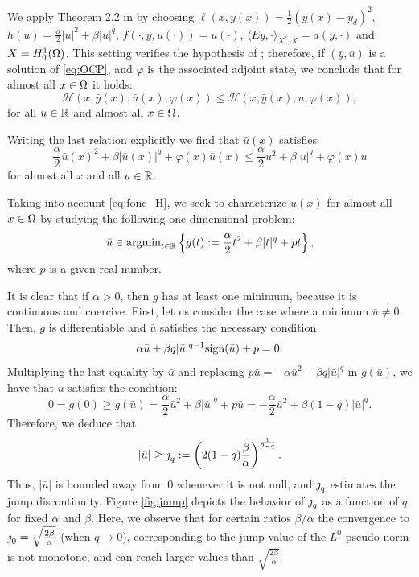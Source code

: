 	We apply Theorem 2.2 in \cite{ito-kunisch2014} by choosing $\ell(x,y(x))=\frac{1}{2}(y(x)-y_d)^2$, $h(u)=\frac{\alpha}{2}|u|^2+\beta|u|^q$, $f(\cdot,y,u(\cdot))=u(\cdot)$, $\langle Ey,\cdot\rangle_{X^*,X}=a(y,\cdot)$ and $X=H_{0}^{1}(\Omega)$. This setting verifies the hypothesis of \cite[Theorem 2.2]{ito-kunisch2014}; therefore,  if $(\bar y, \bar u)$ is a solution of  \eqref{eq:OCP}, and $\varphi$ is the associated adjoint state, we conclude that for almost all $x \in \Omega$ it holds: 
	$$
		\mathcal{H}(x,\bar y(x),\bar u(x),\varphi (x))\leq \mathcal{H}(x,\bar y(x),u,\varphi (x)),
	$$
	 for all $u \in \mathbb{R}$ and almost all $x\in\Omega$. 
	 
	 Writing the last relation explicitly we find that $\bar u(x)$ satisfies
	\begin{equation}\label{eq:fonc_H}
		\frac{\alpha}{2}\bar u(x)^2 + \beta |\bar u(x)|^q + \varphi(x) \bar u(x) \leq \frac{\alpha}{2}u^2 + \beta |u|^q + \varphi(x) u
	\end{equation}
	for almost all $x$ and all $u\in \mathbb{R}$. 
	
	Taking into account \eqref{eq:fonc_H}, we seek to characterize $\bar u(x)$ for almost all $x\in \Omega$ by studying the following one-dimensional problem:
	\begin{equation}\label{eq:1dlq}
		\bar u \displaystyle\in  \operatorname{argmin}_{t\in \mathbb{R}} \left\{g(t):= \frac{\alpha}{2}t^2+\beta |t|^q + pt \right\},
	\end{equation}
	where $p$ is a given real number.
	
	
	It is clear that if $\alpha>0$, then $g$ has at least one minimum, because it is continuous and coercive. 
	First, let us consider the case where a minimum $\bar u \not =0$. 
	Then, $g$ is differentiable and $\bar u$ satisfies the necessary condition 
	\begin{equation}\label{eq:1d_fonc}
		\alpha \bar u + \beta q |\bar u|^{q-1} \mathrm{sign} (\bar u) + p= 0. 	
	\end{equation}
	Multiplying the last equality by $\bar u$ and replacing 
	$p\bar u=-\alpha\bar u^2-\beta q |\bar u|^{q}$ in $g(\bar u)$, 
	we have  that $\bar u$  satisfies the condition:	
	$$ 
	  0=g(0)\geq g(\bar u) = \frac{\alpha}{2}\bar u^2 + \beta |\bar u|^{q} + p\bar u =  -\frac{\alpha}{2}\bar u^2 + \beta (1-q) |\bar u|^{q}.
	$$ 
Therefore, we deduce that
	\begin{equation}\label{eq:jump_bound}
		|\bar u| \geq \operatorname{\jmath}_q:=\left(2(1-q) \frac{\beta}{\alpha} \right)^{\frac{1}{2-q}}.
	\end{equation}
Thus, $|\bar u|$ is bounded away from 0 whenever it is not null, and $\operatorname{\jmath}_q$ estimates the jump discontinuity. Figure \ref{fig:jump} depicts the behavior of $\operatorname{\jmath}_q$ as a function of $q$ for fixed $\alpha$ and $\beta$. Here, we observe that for certain ratios $\beta/\alpha$ the convergence to $\operatorname{\jmath}_0=\sqrt{\frac{2\beta}{\alpha}}$ (when $q\to 0$), corresponding to the jump value of the $L^0$-pseudo norm is not monotone, and can reach larger values than $\sqrt{\frac{2\beta}{\alpha}}$.

